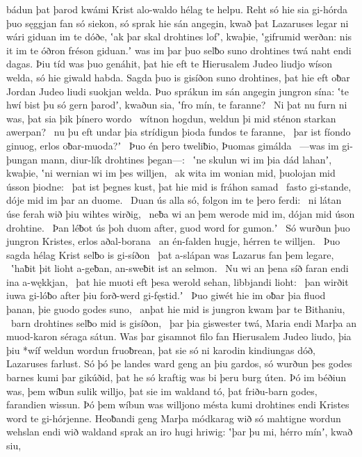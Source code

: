 bádun þat þarod kwámi Krist alo-waldo
hélag te helpu. Reht só hie sia gi-hórda þuo
sęggjan fan só siekon, só sprak hie sán angegin,
kwað þat Lazaruses legar ni wári
giduan im te dóðe, ʽak þar skal drohtines lofʼ, kwaþie,
ʽgifrumid werðan: nis it im te óðron fréson giduan.ʼ
was im þar þuo selƀo suno drohtines
twá naht endi dagas. Þiu tíd was þuo genáhit,
þat hie eft te Hierusalem Judeo liudjo
wíson welda, só hie giwald habda.
Sagda þuo is gisíðon suno drohtines,
þat hie eft oƀar Jordan Judeo liudi
suokjan welda. Þuo sprákun im sán angegin
jungron sína: ʽte hwí bist þu só gern þarodʼ, kwaðun sia,
ʽfro mín, te faranne? \hld\ Ni þat nu furn ni was,
þat sia þik þínero wordo \hld\ wítnon hogdun,
weldun þi mid sténon starkan awerpan? \hld\ nu þu eft undar þia strídigun þioda
fundos te faranne, \hld\ þar ist fíondo ginuog,
erlos oƀar-muoda?ʼ \hld\ Þuo én þero tweliƀio,
Þuomas gimálda \hld\ —was im gi-þungan mann,
diur-lík drohtines þegan—: \hld\ ʽne skulun wi im þia dád lahanʼ, kwaþie,
ʽni wernian wi im þes willjen, \hld\ ak wita im wonian mid,
þuolojan mid ússon þiodne: \hld\ þat ist þegnes kust,
þat hie mid is fráhon samad \hld\ fasto gi-stande,
dóje mid im þar an duome. \hld\ Duan ús alla só,
folgon im te þero ferdi: \hld\ ni látan úse ferah wið þiu
wihtes wirðig, \hld\ neƀa wi an þem werode mid im,
dójan mid úson drohtine. \hld\ Þan léƀot ús þoh duom after,
guod word for gumon.ʼ \hld\ Só wurðun þuo jungron Kristes,
erlos aðal-borana \hld\ an én-falden hugje,
hérren te willjen. \hld\ Þuo sagda hélag Krist
selƀo is gi-síðon \hld\ þat a-slápan was
Lazarus fan þem legare, \hld\ ʽhaƀit þit lioht a-geƀan,
an-sweƀit ist an selmon. \hld\ Nu wi an þena síð faran
endi ina a-wękkjan, \hld\ þat hie muoti eft þesa werold sehan,
libbjandi lioht: \hld\ þan wirðit iuwa gi-lóƀo after þiu
forð-werd gi-fęstid.ʼ \hld\ Þuo giwét hie im oƀar þia fluod þanan,
þie guodo godes suno, \hld\ anþat hie mid is jungron kwam
þar te Bithaniu, \hld\ barn drohtines
selƀo mid is gisíðon, \hld\ þar þia giswester twá,
Maria endi Marþa an muod-karon
séraga sátun. Was þar gisamnot filo
fan Hierusalem Judeo liudo,
þia þiu *wíf weldun wordun fruoƀrean,
þat sie só ni karodin kindiungas dóð,
Lazaruses farlust. Só þó þe landes ward
geng an þiu gardos, só wurðun þes godes barnes
kumi þar gikúðid, þat he só kraftig was
bi þeru burg úten. Þó im béðiun was,
þem wíƀun sulik willjo, þat sie im waldand tó,
þat friðu-barn godes, farandien wissun.
Þó þem wíbun was willjono mésta
kumi drohtines endi Kristes word
te gi-hórjenne. Heoƀandi geng
Marþa módkarag wið só mahtigne
wordun wehslan endi wið waldand sprak
an iro hugi hriwig: ʽþar þu mi, hérro mínʼ, kwað siu,
